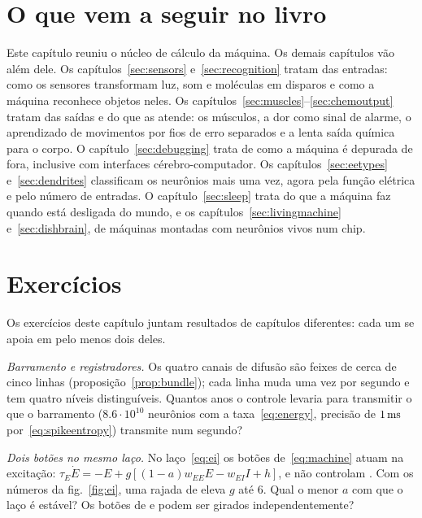 \section{O que vem a seguir no livro}

Este capítulo reuniu o núcleo de cálculo da máquina. Os demais capítulos vão além dele. Os capítulos~\ref{sec:sensors} e~\ref{sec:recognition} tratam das entradas: como os sensores transformam luz, som e moléculas em disparos e como a máquina reconhece objetos neles. Os capítulos~\ref{sec:muscles}--\ref{sec:chemoutput} tratam das saídas e do que as atende: os músculos, a dor como sinal de alarme, o aprendizado de movimentos por fios de erro separados e a lenta saída química para o corpo. O capítulo~\ref{sec:debugging} trata de como a máquina é depurada de fora, inclusive com interfaces cérebro-computador. Os capítulos~\ref{sec:eetypes} e~\ref{sec:dendrites} classificam os neurônios mais uma vez, agora pela função elétrica e pelo número de entradas. O capítulo~\ref{sec:sleep} trata do que a máquina faz quando está desligada do mundo, e os capítulos~\ref{sec:livingmachine} e~\ref{sec:dishbrain}, de máquinas montadas com neurônios vivos num chip.

\section{Exercícios}

Os exercícios deste capítulo juntam resultados de capítulos diferentes: cada um se apoia em pelo menos dois deles.

\begin{exercise}[\lvlA]
\label{ex:10:1}
\emph{Barramento e registradores.} Os quatro canais de difusão são feixes de cerca de cinco linhas (proposição~\ref{prop:bundle}); cada linha muda uma vez por segundo e tem quatro níveis distinguíveis. Quantos anos o controle levaria para transmitir o que o barramento  ($8.6\cdot10^{10}$ neurônios com a taxa~\eqref{eq:energy}, precisão de $1\,\text{ms}$ por~\eqref{eq:spikeentropy}) transmite num segundo?
\end{exercise}

\begin{exercise}[\lvlB]
\label{ex:10:2}
\emph{Dois botões no mesmo laço.} No laço~\eqref{eq:ei} os botões de~\eqref{eq:machine} atuam na excitação: $\tau_E\dot E=-E+g[(1-a)w_{EE}E-w_{EI}I+h]$, e não controlam . Com os números da fig.~\ref{fig:ei}, uma rajada de  eleva $g$ até $6$. Qual o menor $a$ com que o laço é estável? Os botões de  e  podem ser girados independentemente?
\end{exercise}

